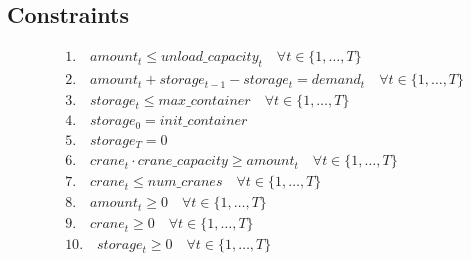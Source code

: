 \documentclass{article}
\begin{document}
\subsection*{Constraints}
\begin{align*}
    & 1. \quad amount_{t} \leq unload\_capacity_{t} \quad \forall t \in \{1, \ldots, T\} \\
    & 2. \quad amount_{t} + storage_{t-1} - storage_{t} = demand_{t} \quad \forall t \in \{1, \ldots, T\} \\
    & 3. \quad storage_{t} \leq max\_container \quad \forall t \in \{1, \ldots, T\} \\
    & 4. \quad storage_{0} = init\_container \\
    & 5. \quad storage_{T} = 0 \\
    & 6. \quad crane_{t} \cdot crane\_capacity \geq amount_{t} \quad \forall t \in \{1, \ldots, T\} \\
    & 7. \quad crane_{t} \leq num\_cranes \quad \forall t \in \{1, \ldots, T\} \\
    & 8. \quad amount_{t} \geq 0 \quad \forall t \in \{1, \ldots, T\} \\
    & 9. \quad crane_{t} \geq 0 \quad \forall t \in \{1, \ldots, T\} \\
    & 10. \quad storage_{t} \geq 0 \quad \forall t \in \{1, \ldots, T\}
\end{align*}
\end{document}
